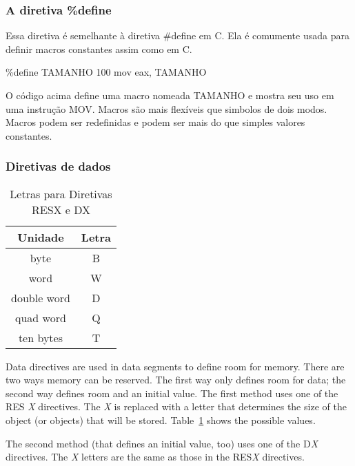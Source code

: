 \subsubsection{A diretiva \%define}

Essa diretiva é semelhante à diretiva {\code \#define} em C. Ela é comumente
usada para definir macros constantes assim como em C.
\begin{AsmCodeListing}[frame=none, numbers=none]
\%define TAMANHO 100
      mov    eax, TAMANHO
\end{AsmCodeListing}
O código acima define uma macro nomeada {\code TAMANHO} e mostra seu uso em uma
instrução {\code MOV}. Macros são mais flexíveis que simbolos de dois modos.
Macros podem ser redefinidas e podem ser mais do que simples valores
constantes.

\subsubsection{Diretivas de dados}

\begin{table}[t]
\centering
\begin{tabular}{||c|c||} \hline
{\bf Unidade} & {\bf Letra} \\
\hline
byte & B \\
word & W \\
double word & D \\
quad word & Q \\
ten bytes & T \\
\hline
\end{tabular}
\caption{Letras para Diretivas {\code RESX} e {\code DX}
         \label{tab:size-letters} }
\end{table}

Data directives are used in data segments to define room for
memory. There are two ways memory can be reserved. The first way only
defines room for data; the second way defines room and an initial
value. The first method uses one of the {\code RES{\em
X}} directives. The {\em X} is replaced
with a letter that determines the size of the object (or objects) that
will be stored. Table~\ref{tab:size-letters} shows the possible
values.

The second method (that defines an initial value, too) uses one of the
{\code D{\em X}} directives. The {\em X}
letters are the same as those in the {\code RES{\em X}} directives.

